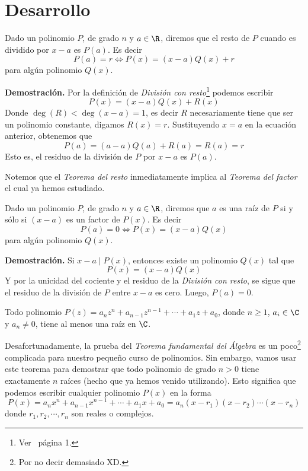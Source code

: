 \section{Desarrollo}

\begin{theorem}
    Dado un polinomio $P$, de grado $n$ y $a \in \R$, diremos que el resto de $P$ cuando es dividido por $x - a$ es $P(a)$.
    Es decir
    \[P(a)   = r \Leftrightarrow P(x) = (x-a)Q(x) + r\]
    para algún polinomio $Q(x).$

    \textbf{Demostración.} Por la definición de \textit{División con resto}\footnote{Ver~\cite{TD23-clase5} página 1.} podemos escribir
    \[P(x) = (x-a)Q(x) + R(x)\]
    Donde $\deg (R) < \deg(x - a) = 1$, es decir $R$ necesariamente tiene que ser un polinomio constante, digamos $R(x) = r$.
    Sustituyendo $x = a$ en la ecuación anterior, obtenemos que
    \[P(a) = (a - a)Q(a) + R(a) = R(a) = r\]
    Esto es, el residuo de la división de $P$ por $x - a$ es $P(a)$.
\end{theorem}

Notemos que el \textit{Teorema del resto} inmediatamente implica al \textit{Teorema del factor} el cual ya hemos estudiado.

\begin{theorem}
    Dado un polinomio $P$, de grado $n$ y $a \in \R$, diremos que $a$ es una raíz de $P$ si y sólo si $(x-a)$ es un factor de $P(x)$.
    Es decir
    \[P(a) = 0 \Leftrightarrow P(x) = (x-a)Q(x)\]
    para algún polinomio $Q(x).$

    \textbf{Demostración.} Si $x - a \mid P(x)$, entonces existe un polinomio $Q(x)$ tal que
    \[P(x) = (x-a)Q(x)\]
    Y por la unicidad del cociente y el residuo de la \textit{División con resto}, se sigue que el residuo de la división de $P$ entre $x - a$ es cero.
    Luego, $P(a) = 0$.
\end{theorem}

\begin{theorem}
    Todo polinomio $P(z) = a_n z^n + a_{n - 1} z^{n - 1} + \cdots + a_1 z + a_0$, donde $n \geq 1$, $a_i \in \C$ y $a_n \neq 0$, tiene al menos una raíz en $\C$.
\end{theorem}

Desafortunadamente, la prueba del \textit{Teorema fundamental del Álgebra} es un poco\footnote{Por no decir demasiado XD.} complicada para nuestro pequeño curso de polinomios.
Sin embargo, vamos usar este teorema para demostrar que todo polinomio de grado $n > 0$ tiene exactamente $n$ raíces (hecho que ya hemos venido utilizando).
Esto significa que podemos escribir cualquier polinomio $P(x)$ en la forma
\[P(x) = a_n x^n + a_{n - 1} x^{n - 1} + \cdots  + a_1 x + a_0 = a_n (x - r_1)(x - r_2) \cdots (x - r_n)\]
donde $r_1, r_2, \cdots, r_n$ son reales o complejos.

